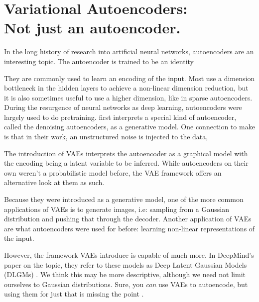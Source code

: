 \documentclass{article}
\begin{document}
\section{Variational Autoencoders:\\Not just an autoencoder.}





In the long history of research into artificial neural networks, autoencoders are an interesting topic. The autoencoder is trained to be an identity 


They are commonly used to learn an encoding of the input. Most use a dimension bottleneck in the hidden layers to achieve a non-linear dimension reduction, but it is also sometimes useful to use a higher dimension, like in sparse autoencoders. During the resurgence of neural networks as deep learning, autoencoders were largely used to do pretraining.
\citep{bengio2013generalized} first interprets a special kind of autoencoder, called the denoising autoencoders, as a generative model. 
One connection to make is that in their work, an unstructured noise is injected to the data, 

The introduction of VAEs \citep{kingma2013auto} interprets the autoencoder as a graphical model with the encoding being a latent variable to be inferred. While autoencoders on their own weren’t a probabilistic model before, the VAE framework offers an alternative look at them as such. 

Because they were introduced as a generative model, one of the more common applications of VAEs is to generate images, i.e: sampling from a Gaussian distribution and pushing that through the decoder. Another application of VAEs are what autoencoders were used for before: learning non-linear representations of the input.

However, the framework VAEs introduce is capable of much more. 
In DeepMind's paper on the topic, they refer to these models as Deep Latent Gaussian Models (DLGMs) \citep{rezende2014stochastic}. 
We think this may be more descriptive, although we need not limit ourselves to Gaussian distributions. 
Sure, you \emph{can} use VAEs to autoencode, but using them for just that is missing the point \cite{chen2016variational}.
\end{document}
